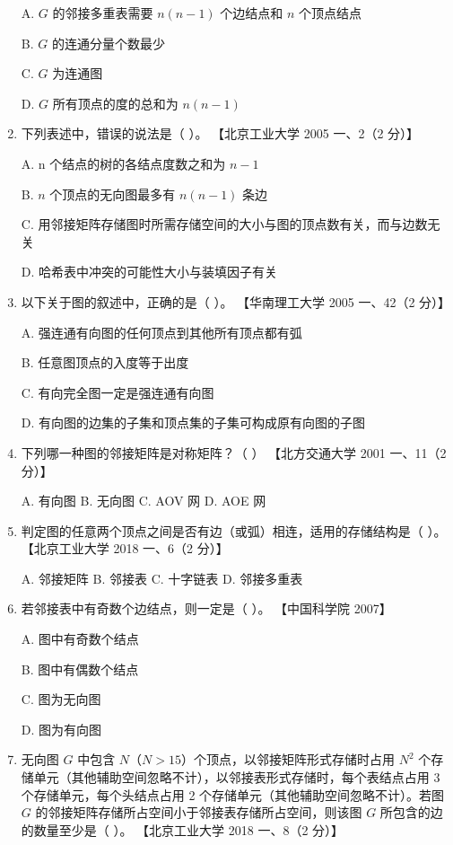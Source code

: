 \documentclass[lang=cn,newtx,10pt,scheme=chinese]{../../elegantbook}
\begin{document}
\begin{enumerate}
        A. $G$ 的邻接多重表需要 $n(n-1)$ 个边结点和 $n$ 个顶点结点  

        B. $G$ 的连通分量个数最少  

        C. $G$ 为连通图  

        D. $G$ 所有顶点的度的总和为 $n(n-1)$  
    
        \item 下列表述中，错误的说法是（ ）。  
        【北京工业大学 2005 一、2（2 分）】  

        A. n 个结点的树的各结点度数之和为 $n-1$  

        B. $n$ 个顶点的无向图最多有 $n(n-1)$ 条边  

        C. 用邻接矩阵存储图时所需存储空间的大小与图的顶点数有关，而与边数无关  

        D. 哈希表中冲突的可能性大小与装填因子有关  
    
        \item 以下关于图的叙述中，正确的是（ ）。  
        【华南理工大学 2005 一、42（2 分）】  

        A. 强连通有向图的任何顶点到其他所有顶点都有弧  

        B. 任意图顶点的入度等于出度  

        C. 有向完全图一定是强连通有向图  

        D. 有向图的边集的子集和顶点集的子集可构成原有向图的子图  
    
        \item 下列哪一种图的邻接矩阵是对称矩阵？（ ）  
        【北方交通大学 2001 一、11（2 分）】  

        A. 有向图 \quad B. 无向图 \quad C. AOV 网 \quad D. AOE 网  
    
        \item 判定图的任意两个顶点之间是否有边（或弧）相连，适用的存储结构是（ ）。  
        【北京工业大学 2018 一、6（2 分）】  

        A. 邻接矩阵 \quad B. 邻接表 \quad C. 十字链表 \quad D. 邻接多重表  
    
        \item 若邻接表中有奇数个边结点，则一定是（ ）。  
        【中国科学院 2007】  

        A. 图中有奇数个结点  

        B. 图中有偶数个结点  

        C. 图为无向图  

        D. 图为有向图  
    
        \item 无向图 $G$ 中包含 $N$（$N > 15$）个顶点，以邻接矩阵形式存储时占用 $N^2$ 个存储单元（其他辅助空间忽略不计），以邻接表形式存储时，每个表结点占用 3 个存储单元，每个头结点占用 2 个存储单元（其他辅助空间忽略不计）。若图 $G$ 的邻接矩阵存储所占空间小于邻接表存储所占空间，则该图 $G$ 所包含的边的数量至少是（ ）。  
        【北京工业大学 2018 一、8（2 分）】  


\end{enumerate}
\end{document}
